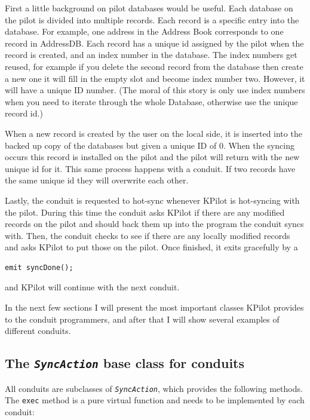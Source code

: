 \documentclass[10pt,a4paper]{article}
\newcommand{\code}[1]{{\small\texttt{#1}}}
\newcommand{\class}[1]{{\small\em\texttt{#1}}}
\begin{document}
    First a little background on pilot databases would be useful.
Each database on the pilot is divided into multiple records.  Each
record is a specific entry into the database.  For example, one
address in the Address Book corresponds to one record in AddressDB.
Each record has a unique id assigned by the pilot when the record is
created, and an index number in the database.  The index numbers get
reused, for example if you delete the second record from the database
then create a new one it will fill in the empty slot and become index
number two.  However, it will have a unique ID number.  (The moral of
this story is only use index numbers when you need to iterate through
the whole Database, otherwise use the unique record id.)

    When a new record is created by the user on the local side, it 
is inserted into the backed up copy of the databases but given a
unique ID of 0.  When the syncing occurs this record is installed on
the pilot and the pilot will return with the new unique id for it.
This same process happens with a conduit.  If two records have the
same unique id they will overwrite each other.

    Lastly, the conduit is requested to
hot-sync whenever KPilot is hot-syncing with the pilot.  During this
time the conduit asks KPilot if there are any modified records on the
pilot and should back them up into the program the conduit syncs
with.   Then, the conduit checks to see if there are any locally
modified records and asks KPilot to put those on the pilot.  Once
finished, it exits gracefully by a 
{\small\begin{verbatim}
emit syncDone();
\end{verbatim}
}
and KPilot will continue with the next conduit.

In the next few sections I will present the most important classes KPilot provides to the conduit programmers, and after that I will show several examples of different conduits.


\subsection{The \class{SyncAction} base class for conduits}

All conduits are subclasses of \class{SyncAction}, which provides the following methods. The \code{exec} method is a pure virtual function and needs to be implemented by each conduit:
\end{document}
